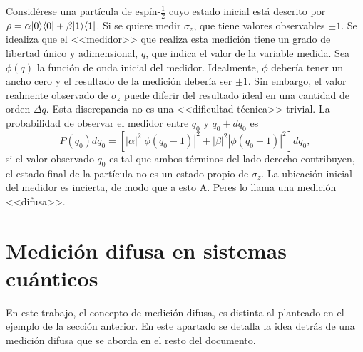Considérese una partícula de espín-$\frac{1}{2}$ cuyo estado inicial está descrito por $\rho=\alpha |0\rangle \langle0| + \beta|1\rangle \langle1|$. Si se quiere medir $\sigma_z$, que tiene valores observables $\pm 1$. Se idealiza que el <<medidor>> que realiza esta medición tiene un grado de libertad único y adimensional, $q$, que indica el valor de la variable medida. Sea $\phi(q)$ la función de onda inicial del medidor. 
Idealmente, $\phi$ debería tener un ancho cero y el resultado de la medición
debería ser $\pm 1$. Sin embargo, el valor realmente observado de $\sigma_z$
puede diferir del resultado ideal en una cantidad de orden $\Delta q$. Esta
discrepancia no es una <<dificultad técnica>> trivial. La probabilidad de
observar el medidor entre $q_0$ y $q_0 + d q_0$
es\[P(q_0)dq_0=[|\alpha|^2|\phi(q_0-1)|^2+|\beta|^2|\phi(q_0+1)|^2]dq_0,\]si el
valor observado $q_0$ es tal que ambos términos del lado derecho contribuyen,
el estado final de la partícula no es un estado propio de $\sigma_z$. La
ubicación inicial del medidor es incierta, de modo que  a esto A. Peres lo
llama una medición <<difusa>>.   


\section{Medición difusa en sistemas cuánticos}



En este trabajo, el concepto de medición difusa,  es distinta al planteado en el ejemplo de la sección anterior.  En este apartado se detalla la idea detrás de una medición difusa que se aborda en el resto del documento.



